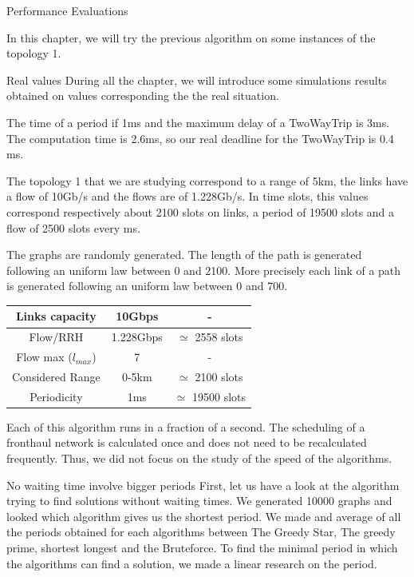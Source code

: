 \documentclass[a4paper,10pt]{report}
\begin{document}
\begin{chapter}{Performance Evaluations}

In this chapter, we will try the previous algorithm on some instances of the topology 1.

\begin{section}{Real values}
 During all the chapter, we will introduce some simulations results obtained on values corresponding the the real situation.
  
  The time of a period if 1ms and the maximum delay of a TwoWayTrip is 3ms. The computation time is 2.6ms, so our real deadline for the 
  TwoWayTrip is 0.4 ms.
  
 The topology 1 that we are studying correspond to a range of 5km, the links have a flow of 10Gb/s and the flows are of 1.228Gb/s.
 In time slots, this values correspond respectively about 2100 slots on links, a period of 19500 slots and a flow of 2500 slots every ms.
 
 The graphs are randomly generated. The length of the path is generated following an uniform law between 0 and 2100. More precisely
 each link of a path is generated following an uniform law between 0 and 700.
 
 \centering
  \begin{tabular}{|c|c|c|}
  \hline
   Links capacity & 10Gbps & -\\
   \hline
   Flow/RRH & 1.228Gbps & $\simeq$ 2558 slots\\
   \hline
   Flow max ($l_{max}$) & 7 & -\\
   \hline
   Considered Range & 0-5km & $\simeq$ 2100 slots\\
   \hline
   Periodicity & 1ms & $\simeq$ 19500 slots\\
   \hline
   \end{tabular}
  
Each of this algorithm runs in a fraction of a second. The scheduling of a fronthaul network is calculated once and does not 
need to be recalculated frequently. Thus, we did not focus on the study of the speed of the algorithms.
\end{section}

\begin{section}{No waiting time involve bigger periods}
First, let us have a look at the algorithm trying to find solutions without waiting times.
We generated 10000 graphs and looked which algorithm gives us the shortest period. We made and average of all the periods obtained for each algorithms
between The Greedy Star, The greedy prime, shortest longest and the Bruteforce.
To find the minimal period in which the algorithms can find a solution, we made a linear research on the period.


\end{section}
\end{chapter}
\end{document}
